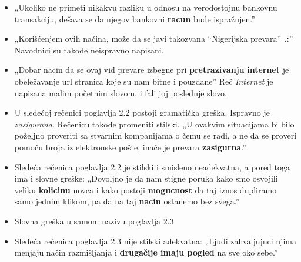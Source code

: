 \documentclass[a4paper]{report}
\begin{document}
\begin{itemize}
\begin{itemize}
    \end{itemize}
    \begin{itemize}
        \item  „Ukoliko ne primeti nikakvu razliku u odnosu na verodostojnu bankovnu transakciju, dešava se da njegov bankovni \textbf{racun} bude ispražnjen.”
    \end{itemize}
    \begin{itemize}
        \item  „Korišćenjem ovih načina, može da se javi takozvana “Nigerijska prevara” \textbf{.:}”
        Navodnici su takođe neispravno napisani.
    \end{itemize}
    \begin{itemize}
        \item  „Dobar nacin da se ovaj vid prevare izbegne pri \textbf{pretrazivanju} \textbf{internet} je obeležavanje url stranica koje su nam bitne i pouzdane”\newline
    Reč \textit{Internet} je napisana malim početnim slovom, i fali joj poslednje slovo.
    \end{itemize}
\end{itemize}
\begin{itemize}
    \item U sledećoj rečenici poglavlja 2.2 postoji gramatička greška. Ispravno je \textit{zasigurana}. Rečenicu takođe promeniti stilski.\newline
    „U ovakvim situacijama bi bilo poželjno proveriti sa stvarnim kompanijama o čemu se radi, a ne da se proveri pomoću broja iz elektronske pošte, inače je prevara \textbf{zasigurna}.”
\end{itemize}
\begin{itemize}
    \item Sledeća rečenica poglavlja 2.2 je stilski i smisleno neadekvatna, a pored toga ima i slovne greške: \newline
    „Dovoljno je da nam stigne poruka kako smo osvojili veliku \textbf{kolicinu} novca i kako postoji \textbf{mogucnost} da taj iznos dupliramo samo jednim klikom, pa da na taj \textbf{nacin} ostanemo bez svega.”
\end{itemize}
\begin{itemize}
    \item Slovna greška u samom nazivu poglavlja 2.3
\end{itemize}
\begin{itemize}
    \item Sledeća rečenica poglavlja 2.3 nije stilski adekvatna: \newline
    „Ljudi zahvaljujuci njima menjaju način razmišljanja i \textbf{drugačije imaju pogled} na sve oko sebe.”
\end{itemize}
\end{document}
